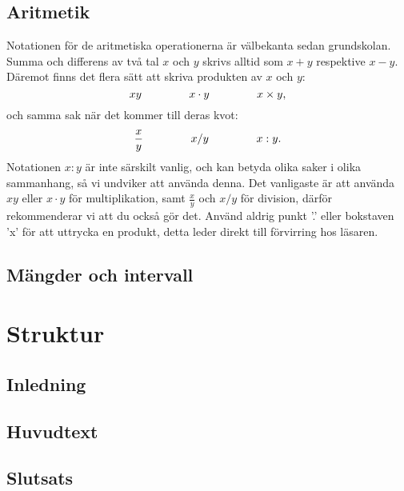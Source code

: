 \documentclass[titlepage]{article}
\begin{document}
\subsection{Aritmetik}

Notationen för de aritmetiska operationerna är välbekanta sedan grundskolan. Summa och differens av två tal $x$ och $y$ skrivs alltid som $x+y$ respektive $x-y$. Däremot finns det flera sätt att skriva produkten av $x$ och $y$:
$$xy \hspace{15mm} x\cdot y \hspace{15mm} x \times y,$$
och samma sak när det kommer till deras kvot:
$$\frac{x}{y} \hspace{15mm} x/y \hspace{15mm}  x : y.$$
Notationen $x:y$ är inte särskilt vanlig, och kan betyda olika saker i olika sammanhang, så vi undviker att använda denna. Det vanligaste är att använda $xy$ eller $x \cdot y$ för multiplikation, samt $\frac{x}{y}$ och $x/y$ för division, därför rekommenderar vi att du också gör det. Använd aldrig punkt '.' eller bokstaven 'x' för att uttrycka en produkt, detta leder direkt till förvirring hos läsaren.





\subsection{Mängder och intervall}






\section{Struktur}

\subsection{Inledning}

\subsection{Huvudtext}

\subsection{Slutsats}
\end{document}
